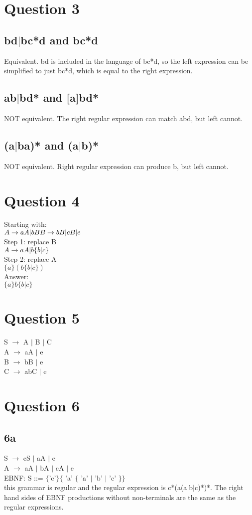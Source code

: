 \documentclass[12pt]{article}
\begin{document}
\section{Question 3}
\subsection{bd$|$bc*d and bc*d}
Equivalent. bd is included in the language of bc*d, so the left expression can be simplified to just bc*d, which is equal to the right expression.

\subsection{ab$|$bd* and [a]bd*}
NOT equivalent. The right regular expression can match abd, but left cannot.

\subsection{(a$|$ba)* and (a$|$b)*}
NOT equivalent. Right regular expression can produce b, but left cannot.

\section{Question 4}
Starting with: \\
$A \to aA | bB \\
B \to bB | cB | e $\\[0.4cm]
Step 1: replace B\\
$A \to aA | b\{b|c\}$\\[0.4cm]
Step 2: replace A\\
$\{a\}(b\{b|c\})$\\[0.5cm]
Answer: \\
$\{a\}b\{b|c\}$


\section{Question 5}
S $\to$ A $|$ B $|$ C \\
A $\to$ aA $|$ e \\
B $\to$ bB $|$ e \\
C $\to$ abC $|$ e


\section{Question 6}

\subsection{6a}
S $\to$ cS $|$ aA $|$ e \\
A $\to$ aA $|$ bA $|$ cA $|$ e 
\noindent \\[0.3cm]
EBNF: S ::= $\lbrace$'c'$\rbrace$$\lbrace$ 'a' $\lbrace$ 'a' $|$ 'b' $|$ 'c' $\rbrace$$\rbrace$ \\[0.3cm]
this grammar is regular and the regular expression is c*(a(a$|$b$|$c)*)*. The right hand sides of EBNF productions without non-terminals are the same as the regular expressions.
\end{document}
